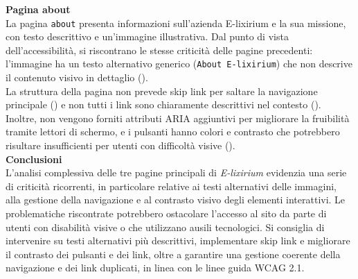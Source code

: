 \noindent \textbf{Pagina about}\\
La pagina \texttt{about} presenta informazioni sull’azienda E-lixirium e la sua missione, con testo descrittivo e un’immagine illustrativa. Dal punto di vista dell’accessibilità, si riscontrano le stesse criticità delle pagine precedenti: l’immagine ha un testo alternativo generico (\texttt{About E-lixirium}) che non descrive il contenuto visivo in dettaglio ({}).\\
La struttura della pagina non prevede skip link per saltare la navigazione principale ({}) e non tutti i link sono chiaramente descrittivi nel contesto ({}). Inoltre, non vengono forniti attributi ARIA aggiuntivi per migliorare la fruibilità tramite lettori di schermo, e i pulsanti hanno colori e contrasto che potrebbero risultare insufficienti per utenti con difficoltà visive ({}).\\

\noindent \textbf{Conclusioni}\\
L’analisi complessiva delle tre pagine principali di \textit{E-lixirium} evidenzia una serie di criticità ricorrenti, in particolare relative ai testi alternativi delle immagini, alla gestione della navigazione e al contrasto visivo degli elementi interattivi. Le problematiche riscontrate potrebbero ostacolare l’accesso al sito da parte di utenti con disabilità visive o che utilizzano ausili tecnologici. Si consiglia di intervenire su testi alternativi più descrittivi, implementare skip link e migliorare il contrasto dei pulsanti e dei link, oltre a garantire una gestione coerente della navigazione e dei link duplicati, in linea con le linee guida WCAG 2.1.

